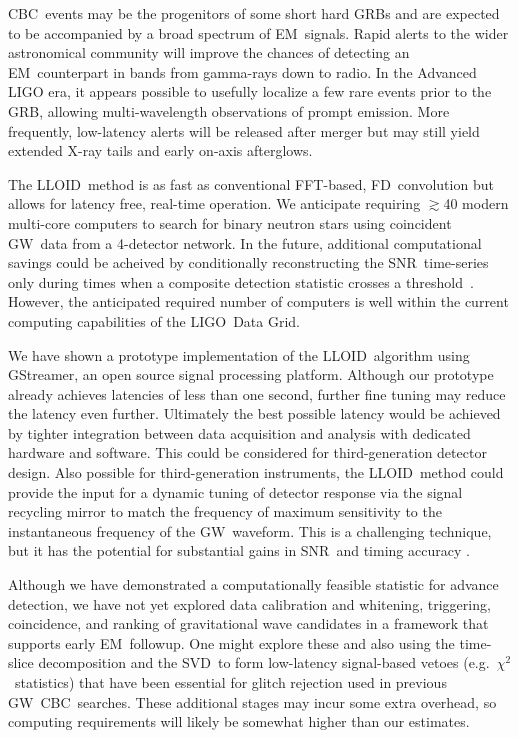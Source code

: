 \documentclass[preprint2]{aastex}
\newcommand{\GW}{GW}%
\newcommand{\EM}{EM}%
\newcommand{\GRB}{GRB}%
\newcommand{\CBC}{CBC}%
\newcommand{\LIGO}{LIGO}%
\newcommand{\SNR}{SNR}%
\newcommand{\SVD}{SVD}%
\newcommand{\fft}{FFT}%
\newcommand{\gstreamer}{GStreamer}
\newcommand{\lloid}{LLOID}%
\newcommand{\FD}{FD}%
\begin{document}
\CBC\ events may be the progenitors of some short hard \GRB{}s and are expected
to be accompanied by a broad spectrum of \EM\ signals. Rapid alerts to the
wider astronomical community will improve the chances of detecting an \EM\
counterpart in bands from gamma-rays down to radio. In the Advanced LIGO
era, it appears possible to usefully localize a few rare events prior to the
\GRB{}, allowing multi-wavelength observations of prompt emission. More
frequently, low-latency alerts will be released after merger but may still
yield extended X-ray tails and early on-axis afterglows.

The \lloid\ method is as fast as conventional \fft-based, \FD\ convolution but allows for
latency free, real-time operation.  We anticipate requiring $\gtrsim$40
modern multi-core computers to search for binary neutron stars using
coincident \GW\ data from a 4-detector network.  In the future, additional
computational savings could be acheived by conditionally reconstructing the
\SNR\ time-series only during times when a composite detection statistic
crosses a threshold~\citep{svd-compdetstat}.  However, the anticipated required
number of computers is well within the current computing capabilities of the
\LIGO\ Data Grid.

We have shown a prototype implementation of the \lloid\ algorithm using
\gstreamer, an open source signal processing platform.  Although our prototype
already achieves latencies of less than one second, further fine tuning may
reduce the latency even further.  Ultimately the best
possible latency would be achieved by tighter integration between data
acquisition and analysis with dedicated hardware and software. This could be
considered for third-generation detector design.  Also possible for
third-generation instruments, the \lloid\ method could provide the input for a
dynamic tuning of detector response via the signal recycling mirror to match
the frequency of maximum sensitivity to the instantaneous frequency of the
\GW\ waveform.  This is a challenging technique, but it has the potential for
substantial gains in \SNR\ and timing accuracy \citep{PhysRevD.47.2184}.

Although we have demonstrated a computationally feasible statistic
for advance detection, we have not yet explored data calibration and whitening,
triggering, coincidence, and ranking of gravitational wave candidates in a
framework that supports early \EM\ followup.  One might explore these and also
using the time-slice decomposition and the \SVD\ to form low-latency
signal-based vetoes (e.g.~$\chi^2$~statistics) that have been essential for
glitch rejection used in previous \GW\ \CBC\ searches.  These additional stages
may incur some extra overhead, so computing requirements will likely be somewhat
higher than our estimates.
\end{document}
